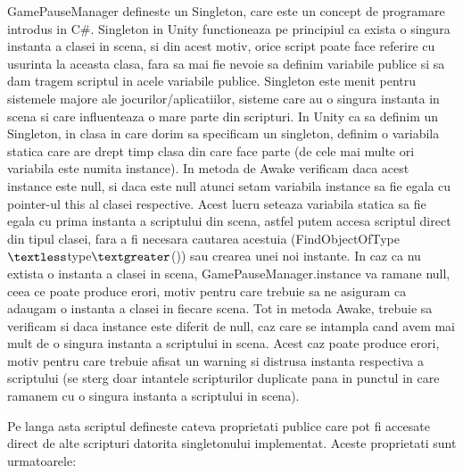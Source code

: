 \documentclass[12pt, a4paper]{article}
\begin{document}
	GamePauseManager defineste un Singleton, care este un concept de programare introdus in C\#. Singleton in Unity functioneaza pe principiul ca exista o singura instanta a clasei in scena, si din acest motiv, orice script poate face referire cu usurinta la aceasta clasa, fara sa mai fie nevoie sa definim variabile publice si sa dam tragem scriptul in acele variabile publice. Singleton este menit pentru sistemele majore ale jocurilor/aplicatiilor, sisteme care au o singura instanta in scena si care influenteaza o mare parte din scripturi. In Unity ca sa definim un Singleton, in clasa in care dorim sa specificam un singleton, definim o variabila statica care are drept timp clasa din care face parte (de cele mai multe ori variabila este numita instance). In metoda de Awake verificam daca acest instance este null, si daca este null atunci setam variabila instance sa fie egala cu pointer-ul this al clasei respective. Acest lucru seteaza variabila statica sa fie egala cu prima instanta a scriptului din scena, astfel putem accesa scriptul direct din tipul clasei, fara a fi necesara cautarea acestuia (FindObjectOfType$\textless$type$\textgreater$()) sau crearea unei noi instante. In caz ca nu extista o instanta a clasei in scena, GamePauseManager.instance va ramane null, ceea ce poate produce erori, motiv pentru care trebuie sa ne asiguram ca adaugam o instanta a clasei in fiecare scena. Tot in metoda Awake, trebuie sa verificam si daca instance este diferit de null, caz care se intampla cand avem mai mult de o singura instanta a scriptului in scena. Acest caz poate produce erori, motiv pentru care trebuie afisat un warning si distrusa instanta respectiva a scriptului (se sterg doar intantele scripturilor duplicate pana in punctul in care ramanem cu o singura instanta a scriptului in scena).
	
	Pe langa asta scriptul defineste cateva proprietati publice care pot fi accesate direct de alte scripturi datorita singletonului implementat. Aceste proprietati sunt urmatoarele:
	
\end{document}
